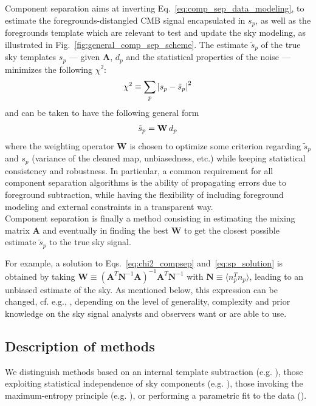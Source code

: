Component separation aims at inverting Eq.~\ref{eq:comp_sep_data_modeling}, to estimate the foregrounds-distangled CMB signal encapsulated in $s_p$, as well as the foregrounds template which are relevant to test and update the sky modeling, as illustrated in Fig.~\ref{fig:general_comp_sep_scheme}.
The estimate $\tilde{s}_p$ of the true sky templates $s_p$ --- given $\mathbf{A}$, $d_p$ and the statistical properties of the noise --- minimizes the following $\chi^2$:
\begin{eqnarray}
	\centering
		\chi^2 \equiv \sum_p \left| s_p - \tilde{s}_p\right|^2
	\label{eq:chi2_compsep}
\end{eqnarray}
and can be taken to have the following general form
\begin{eqnarray}
	\centering
		\tilde{s}_p = \mathbf{W}\,d_p
	\label{eq:sp_solution}
\end{eqnarray}
where the weighting operator $\mathbf{W}$ is chosen to optimize some criterion regarding $\tilde{s}_p$ and $s_p$ (variance of the cleaned map, unbiasedness, etc.) while keeping statistical consistency and robustness. In particular, a common requirement for all component separation algorithms is the ability of propagating errors due to foreground subtraction, while having the flexibility of including foreground modeling and external constraints in a transparent way. \\
Component separation is finally a method consisting in estimating the mixing matrix $\mathbf{A}$ and eventually in finding the best $\mathbf{W}$ to get the closest possible estimate $\tilde{s}_p$ to the true sky signal.

For example, a solution to Eqs.~\ref{eq:chi2_compsep} and~\ref{eq:sp_solution} is obtained by taking $\mathbf{W} \equiv \left( \mathbf{A}^T\mathbf{N}^{-1}\mathbf{A} \right)^{-1}\mathbf{A}^T\mathbf{N}^{-1}$ with $\mathbf{N} \equiv \langle n_p^T n_p\rangle$, leading to an unbiased estimate of the sky. As mentioned below, this expression can be changed, cf. e.g., \cite{delabrouille09}, depending on the level of generality, complexity and prior knowledge on the sky signal analysts and observers want or are able to use. 

\subsection{Description of methods}

We distinguish methods based on an internal template subtraction (e.g. \cite{bennett92,hansen06,katayama11}), those exploiting statistical independence of sky components (e.g. \cite{delabrouille03,maino07,bonaldi06}), those invoking the maximum-entropy principle (e.g. \cite{stolyarov05}), or performing a parametric fit to the data (\cite{brandt94,eriksen06, stompor09}).


